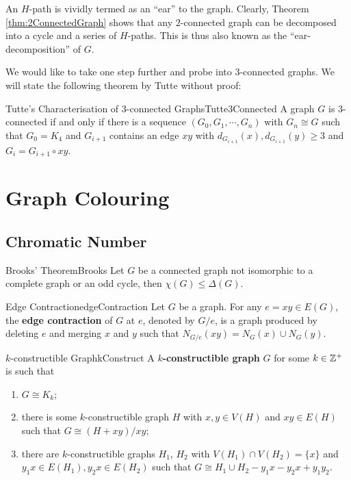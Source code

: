 \documentclass[math, code]{amznotes}
\theoremstyle{remark}
\begin{document}
An $H$-path is vividly termed as an ``ear'' to the graph. Clearly, Theorem \ref{thm:2ConnectedGraph} shows that any $2$-connected graph can be decomposed into a cycle and a series of $H$-paths. This is thus also known as the ``ear-decomposition'' of $G$.

We would like to take one step further and probe into $3$-connected graphs. We will state the following theorem by Tutte without proof:
\begin{thmbox}{Tutte's Characterisation of $3$-connected Graphs}{Tutte3Connected}
    A graph $G$ is $3$-connected if and only if there is a sequence $\left(G_0, G_1, \cdots, G_n\right)$ with $G_n \cong G$ such that $G_0 = K_4$ and $G_{i + 1}$ contains an edge $xy$ with $d_{G_{i + 1}}(x), d_{G_{i + 1}}(y) \geq 3$ and $G_i = G_{i + 1} \circ xy$. 
\end{thmbox}
\chapter{Graph Colouring}
\section{Chromatic Number}
\begin{thmbox}{Brooks' Theorem}{Brooks}
    Let $G$ be a connected graph not isomorphic to a complete graph or an odd cycle, then $\chi(G) \leq \Delta(G)$.
\end{thmbox}
\begin{dfnbox}{Edge Contraction}{edgeContraction}
    Let $G$ be a graph. For any $e = xy \in E(G)$, the {\color{red} \textbf{edge contraction}} of $G$ at $e$, denoted by $G/e$, is a graph produced by deleting $e$ and merging $x$ and $y$ such that $N_{G/e}(xy) = N_G(x) \cup N_G(y)$.
\end{dfnbox}
\begin{dfnbox}{$k$-constructible Graph}{kConstruct}
    A {\color{red} \textbf{$k$-constructible graph}} $G$ for some $k \in \mathbb{Z}^+$ is such that 
    \begin{enumerate}
        \item $G \cong K_k$;
        \item there is some $k$-constructible graph $H$ with $x, y \in V(H)$ and $xy \in E(H)$ such that $G \cong (H + xy)/xy$;
        \item there are $k$-constructible graphs $H_1$, $H_2$ with $V(H_1) \cap V(H_2) = \{x\}$ and $y_1x \in E(H_1), y_2x \in E(H_2)$ such that $G \cong H_1 \cup H_2 - y_1x - y_2x + y_1y_2$.
    \end{enumerate}
\end{dfnbox}
\end{document}
